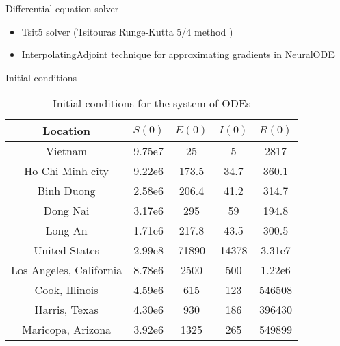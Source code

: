 \begin{frame}{Differential equation solver}
    \begin{itemize}
        \item Tsit5 solver (Tsitouras Runge-Kutta 5/4 method \cite{tsitourasRungeKuttaPairs2011})
        \item InterpolatingAdjoint technique for approximating gradients in \gls{NeuralODE} \cite{daulbaevInterpolationTechniqueSpeed2020}
    \end{itemize}
\end{frame}

\begin{frame}{Initial conditions}
    \begin{table}[h]
        \centering
        \begin{tabular}{| c | c | c | c | c |}
            Location & $S(0)$ & $E(0)$ & $I(0)$ & $R(0)$ \\
            \hline\hline
            Vietnam & 9.75e7 & 25 & 5 & 2817 \\
            \hline
            Ho Chi Minh city & 9.22e6 & 173.5 & 34.7 & 360.1 \\
            \hline
            Binh Duong & 2.58e6 & 206.4 & 41.2 & 314.7 \\
            \hline
            Dong Nai & 3.17e6 & 295 & 59 & 194.8 \\
            \hline
            Long An & 1.71e6 & 217.8 & 43.5 & 300.5 \\
            \hline
            United States & 2.99e8 & 71890 & 14378 & 3.31e7 \\
            \hline
            Los Angeles, California & 8.78e6 & 2500 & 500 & 1.22e6 \\
            \hline
            Cook, Illinois & 4.59e6 & 615 & 123 & 546508 \\
            \hline
            Harris, Texas & 4.30e6 & 930 & 186 & 396430 \\
            \hline
            Maricopa, Arizona & 3.92e6 & 1325 & 265 & 549899 \\
            \hline
        \end{tabular}
        \caption{Initial conditions for the system of \glspl{ODE}}
        \label{tab:ude-model-initial-conditions}
    \end{table}
\end{frame}

